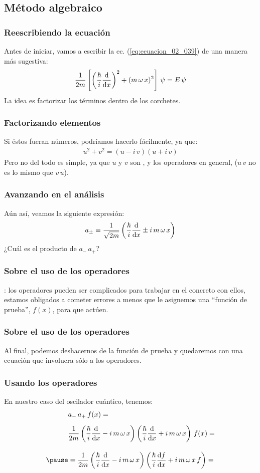 \documentclass[12pt]{beamer}
\begin{document}
\subsection{Método algebraico}

\begin{frame}
\frametitle{Reescribiendo la ecuación}
Antes de iniciar, vamos a escribir la ec. (\ref{eq:ecuacion_02_039}) de una manera más sugestiva:
\pause
\begin{equation}
\dfrac{1}{2 m} \left[ \left( \dfrac{\hbar}{i} \dv{x} \right)^{2} + (m \, \omega \, x)^{2} \right] \, \psi = E \, \psi
\label{eq:ecuacion_02_040}
\end{equation}
\pause
La idea es factorizar los términos dentro de los corchetes.
\end{frame}
\begin{frame}
\frametitle{Factorizando elementos}
Si éstos fueran números, podríamos hacerlo fácilmente, ya que:
\pause
\begin{align*}
u^{2} + v^{2} = (u - i \, v)(u + i \, v)
\end{align*}
Pero no del todo es simple, ya que $u$ y $v$ son , \pause y los operadores en general,  ($u \, v$ no es lo mismo que $v \, u$).
\end{frame}
\begin{frame}
\frametitle{Avanzando en el análisis}
Aún así, veamos la siguiente expresión:
\pause
\begin{equation}
a_{\pm} \equiv \dfrac{1}{\sqrt{2 m }} \left( \dfrac{\hbar}{i} \dv{x} \pm i \, m \, \omega \, x \right)
\label{eq:ecuacion_02_041}
\end{equation}
\pause
¿Cuál es el producto de $a_{-} \, a_{+}$? 
\end{frame}
\begin{frame}
\frametitle{Sobre el uso de los operadores}
: \pause los operadores pueden ser complicados para trabajar en el concreto con ellos, \pause estamos obligados a cometer errores a menos que le asignemos una \enquote{función de prueba}, $f (x)$, para que actúen.
\end{frame}
\begin{frame}
\frametitle{Sobre el uso de los operadores}
Al final, podemos deshacernos de la función de prueba y quedaremos con una ecuación que involucra sólo a los operadores.
\end{frame}
\begin{frame}
\frametitle{Usando los operadores}
En nuestro caso del oscilador cuántico, tenemos:
\pause
\begin{eqnarray*}
\begin{aligned}
&a_{-} \, a_{+} \, f(x) =  \\[0.5em]
&\dfrac{1}{2 m} \left( \dfrac{\hbar}{i} \dv{x} - i \, m \, \omega \, x \right) \left( \dfrac{\hbar}{i} \dv{x} + i \, m \, \omega \, x \right) \, f(x) = \\[1em] \pause
&= \dfrac{1}{2 m} \left( \dfrac{\hbar}{i} \dv{x} - i \, m \, \omega \, x \right) \left( \dfrac{\hbar}{i} \dv{f}{x} + i \, m \, \omega \, x \, f \right) =
\end{aligned}
\end{eqnarray*}
\end{frame}
\end{document}
